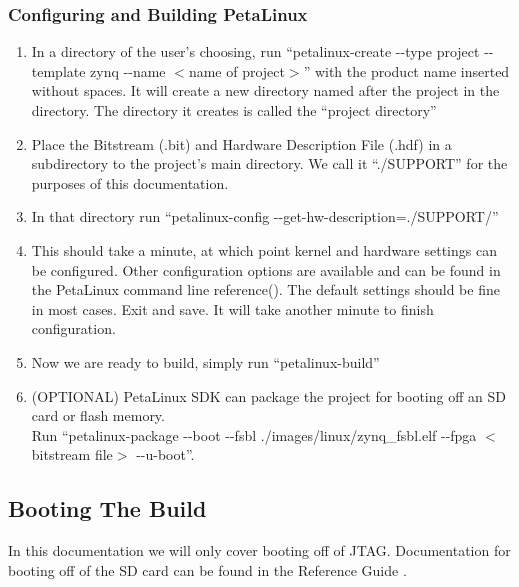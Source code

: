 \subsubsection{Configuring and Building PetaLinux}
\begin{enumerate}
\item In a directory of the user's choosing, run ``petalinux-create -{}-type project -{}-template zynq -{}-name $<$name of project$>$'' with the product name inserted without spaces. It will create a new directory named after the project in the directory. The directory it creates is called the ``project directory''
\item Place the Bitstream (.bit) and Hardware Description File (.hdf) in a subdirectory to the project's main directory. We  call it ``./SUPPORT'' for the purposes of this documentation.
\item In that directory run ``petalinux-config -{}-get-hw-description=./SUPPORT/''
\item This should take a minute, at which point kernel and hardware settings can be configured. Other configuration options are available and can be found in the PetaLinux command line reference(\cite{commands}). The default settings should be fine in most cases. Exit and save. It will take another minute to finish configuration. 
\item Now we are ready to build, simply run ``petalinux-build''
\item (OPTIONAL) PetaLinux SDK can package the project for booting off an SD card or flash memory. 
\\Run \nohyphens{``petalinux-package -{}-boot -{}-fsbl ./images/linux/zynq\_fsbl.elf -{}-fpga $<$bitstream file$>$ -{}-u-boot''.}
\end{enumerate}
\subsection{Booting The Build}
In this documentation we will only cover booting off of JTAG. Documentation for booting off of the SD card can be found in the Reference Guide \cite{reference}.

